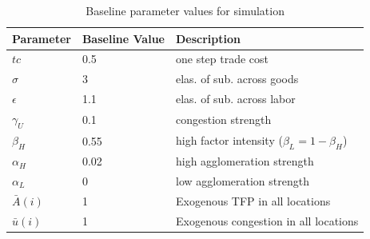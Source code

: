 \documentclass{article}
\begin{document}
    \begin{table}
        \centering
        \begin{tabular}{lll}
           \hline \hline
           Parameter    & Baseline Value & Description                                     \\ \hline
           $tc$         & 0.5            & one step trade cost                             \\
           $\sigma$     & 3              & elas. of sub. across goods                      \\
           $\epsilon$   & 1.1            & elas. of sub. across labor                      \\
           $\gamma_U$   & 0.1            & congestion strength                             \\
           $\beta_H$    & 0.55           & high factor intensity ($\beta_L = 1 - \beta_H$) \\
           $\alpha_H$   & 0.02           & high agglomeration strength                     \\
           $\alpha_L$   & 0              & low agglomeration strength                      \\
           $\bar{A}(i)$ & 1              & Exogenous TFP in all locations                  \\
           $\bar{u}(i)$ & 1              & Exogenous congestion in all locations           \\ \hline
        \end{tabular}
        \caption{Baseline parameter values for simulation}
        \label{tab:baseline}
    \end{table}
\end{document}
